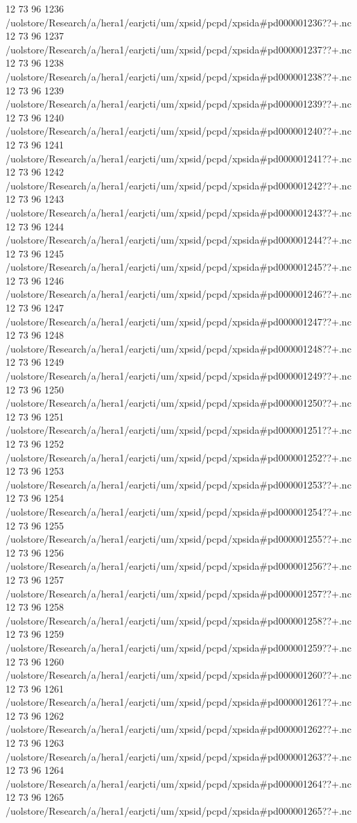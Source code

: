 12 73 96
1236
/uolstore/Research/a/hera1/earjcti/um/xpsid/pcpd/xpsida#pd000001236??+.nc
12 73 96
1237
/uolstore/Research/a/hera1/earjcti/um/xpsid/pcpd/xpsida#pd000001237??+.nc
12 73 96
1238
/uolstore/Research/a/hera1/earjcti/um/xpsid/pcpd/xpsida#pd000001238??+.nc
12 73 96
1239
/uolstore/Research/a/hera1/earjcti/um/xpsid/pcpd/xpsida#pd000001239??+.nc
12 73 96
1240
/uolstore/Research/a/hera1/earjcti/um/xpsid/pcpd/xpsida#pd000001240??+.nc
12 73 96
1241
/uolstore/Research/a/hera1/earjcti/um/xpsid/pcpd/xpsida#pd000001241??+.nc
12 73 96
1242
/uolstore/Research/a/hera1/earjcti/um/xpsid/pcpd/xpsida#pd000001242??+.nc
12 73 96
1243
/uolstore/Research/a/hera1/earjcti/um/xpsid/pcpd/xpsida#pd000001243??+.nc
12 73 96
1244
/uolstore/Research/a/hera1/earjcti/um/xpsid/pcpd/xpsida#pd000001244??+.nc
12 73 96
1245
/uolstore/Research/a/hera1/earjcti/um/xpsid/pcpd/xpsida#pd000001245??+.nc
12 73 96
1246
/uolstore/Research/a/hera1/earjcti/um/xpsid/pcpd/xpsida#pd000001246??+.nc
12 73 96
1247
/uolstore/Research/a/hera1/earjcti/um/xpsid/pcpd/xpsida#pd000001247??+.nc
12 73 96
1248
/uolstore/Research/a/hera1/earjcti/um/xpsid/pcpd/xpsida#pd000001248??+.nc
12 73 96
1249
/uolstore/Research/a/hera1/earjcti/um/xpsid/pcpd/xpsida#pd000001249??+.nc
12 73 96
1250
/uolstore/Research/a/hera1/earjcti/um/xpsid/pcpd/xpsida#pd000001250??+.nc
12 73 96
1251
/uolstore/Research/a/hera1/earjcti/um/xpsid/pcpd/xpsida#pd000001251??+.nc
12 73 96
1252
/uolstore/Research/a/hera1/earjcti/um/xpsid/pcpd/xpsida#pd000001252??+.nc
12 73 96
1253
/uolstore/Research/a/hera1/earjcti/um/xpsid/pcpd/xpsida#pd000001253??+.nc
12 73 96
1254
/uolstore/Research/a/hera1/earjcti/um/xpsid/pcpd/xpsida#pd000001254??+.nc
12 73 96
1255
/uolstore/Research/a/hera1/earjcti/um/xpsid/pcpd/xpsida#pd000001255??+.nc
12 73 96
1256
/uolstore/Research/a/hera1/earjcti/um/xpsid/pcpd/xpsida#pd000001256??+.nc
12 73 96
1257
/uolstore/Research/a/hera1/earjcti/um/xpsid/pcpd/xpsida#pd000001257??+.nc
12 73 96
1258
/uolstore/Research/a/hera1/earjcti/um/xpsid/pcpd/xpsida#pd000001258??+.nc
12 73 96
1259
/uolstore/Research/a/hera1/earjcti/um/xpsid/pcpd/xpsida#pd000001259??+.nc
12 73 96
1260
/uolstore/Research/a/hera1/earjcti/um/xpsid/pcpd/xpsida#pd000001260??+.nc
12 73 96
1261
/uolstore/Research/a/hera1/earjcti/um/xpsid/pcpd/xpsida#pd000001261??+.nc
12 73 96
1262
/uolstore/Research/a/hera1/earjcti/um/xpsid/pcpd/xpsida#pd000001262??+.nc
12 73 96
1263
/uolstore/Research/a/hera1/earjcti/um/xpsid/pcpd/xpsida#pd000001263??+.nc
12 73 96
1264
/uolstore/Research/a/hera1/earjcti/um/xpsid/pcpd/xpsida#pd000001264??+.nc
12 73 96
1265
/uolstore/Research/a/hera1/earjcti/um/xpsid/pcpd/xpsida#pd000001265??+.nc

